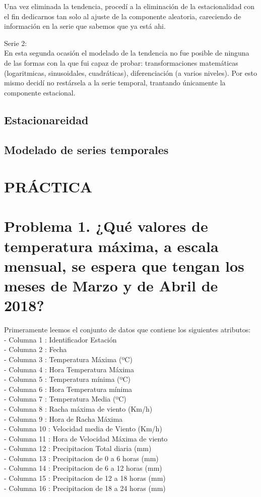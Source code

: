 \documentclass[]{article}
\begin{document}
Una vez eliminada la tendencia, procedí a la eliminación de la
estacionalidad con el fin dedicarnos tan solo al ajuste de la componente
aleatoria, careciendo de información en la serie que sabemos que ya está
ahi.

Serie 2:\\
En esta segunda ocasión el modelado de la tendencia no fue posible de
ninguna de las formas con la que fui capaz de probar: transformaciones
matemáticas (logaritmicas, sinusoidales, cuadráticas), diferenciación (a
varios niveles). Por esto mismo decidí no restársela a la serie
temporal, trantando únicamente la componente estacional.

\subsection{Estacionareidad}

\subsection{Modelado de series temporales}

\section{PRÁCTICA}

\section{Problema 1. ¿Qué valores de temperatura máxima, a escala mensual, se espera que tengan los meses de Marzo y de Abril de 2018?}

Primeramente leemos el conjunto de datos que contiene los siguientes
atributos:\\
- Columna 1 : Identificador Estación\\
- Columna 2 : Fecha\\
- Columna 3 : Temperatura Máxima (ºC)\\
- Columna 4 : Hora Temperatura Máxima\\
- Columna 5 : Temperatura mínima (ºC)\\
- Columna 6 : Hora Temperatura mínima\\
- Columna 7 : Temperatura Media (ºC)\\
- Columna 8 : Racha máxima de viento (Km/h)\\
- Columna 9 : Hora de Racha Máxima\\
- Columna 10 : Velocidad media de Viento (Km/h)\\
- Columna 11 : Hora de Velocidad Máxima de viento\\
- Columna 12 : Precipitacion Total diaria (mm)\\
- Columna 13 : Precipitacion de 0 a 6 horas (mm)\\
- Columna 14 : Precipitacion de 6 a 12 horas (mm)\\
- Columna 15 : Precipitacion de 12 a 18 horas (mm)\\
- Columna 16 : Precipitacion de 18 a 24 horas (mm)
\end{document}
